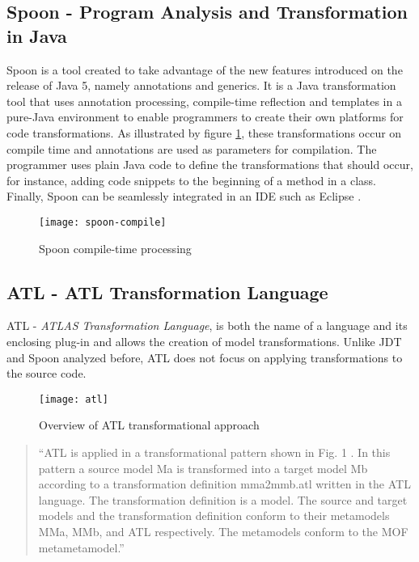 \subsection{Spoon - Program Analysis and Transformation in Java}
	Spoon is a tool created to take advantage of the new features introduced on the release of Java 5, namely annotations and generics. It is a Java transformation tool that uses annotation processing, compile-time reflection and templates in a pure-Java environment to enable programmers to create their own platforms for code transformations. As illustrated by figure \ref{fig:spoon-compile}, these transformations occur on compile time and annotations are used as parameters for compilation. The programmer uses plain Java code to define the transformations that should occur, for instance, adding code snippets to the beginning of a method in a class. Finally, Spoon can be seamlessly integrated in an IDE such as Eclipse \cite{spoon,pawlak2006spoon}.

	\begin{figure}[h]
	  \begin{center}
	    \leavevmode
	    \texttt{[image: spoon-compile]}
	    \caption{Spoon compile-time processing \cite{pawlak2006spoon}}
	    \label{fig:spoon-compile}
	  \end{center}
	\end{figure}

\subsection{ATL - ATL Transformation Language }
	ATL - \emph{ATLAS Transformation Language}, is both the name of a language and its enclosing plug-in and allows the creation of model transformations. Unlike JDT and Spoon analyzed before, ATL does not focus on applying transformations to the source code.

	\begin{figure}[h]
	  \begin{center}
	    \leavevmode
	    \texttt{[image: atl]}
	    \caption{Overview of ATL transformational approach \cite{jouault2006transforming}}
	    \label{fig:so-atl-wow}
	  \end{center}
	\end{figure}

	\begin{quote}
		``ATL is applied in a transformational pattern shown in Fig. 1 . In this pattern a source model Ma is transformed into a target model Mb according to a transformation definition mma2mmb.atl written in the ATL language. The transformation definition is a model. The source and target models and the transformation definition conform to their metamodels MMa, MMb, and ATL respectively. The metamodels conform to the MOF metametamodel.''
	\end{quote}

